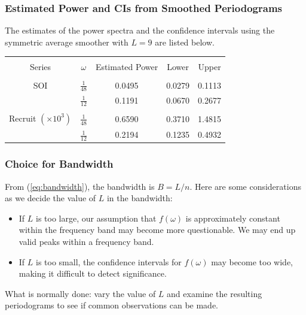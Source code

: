 \documentclass[%
xcolor=pdftex]{beamer}
\begin{document}
\begin{frame}
\frametitle{Estimated Power and CIs from Smoothed Periodograms}

The estimates of the power spectra and the confidence intervals using the symmetric average smoother with $L=9$ are listed below.

\begin{center}
\begin{tabular}{ccccc}
\hline \\
Series & $\omega$ & Estimated Power & Lower & Upper \\
\hline \\
SOI & $\frac{1}{48}$ & 0.0495 & 0.0279 & 0.1113\\
    & $\frac{1}{12}$ & 0.1191 & 0.0670 & 0.2677 \\
    \hline\\
Recruit $(\times 10^3)$ & $\frac{1}{48}$ & 0.6590 & 0.3710 & 1.4815 \\
                        & $\frac{1}{12}$ & 0.2194 & 0.1235 & 0.4932 \\
\hline
\end{tabular}
\end{center}

\end{frame}

\begin{frame}
\frametitle{Choice for Bandwidth}

From (\ref{eq:bandwidth}), the bandwidth is $B = L/n$. Here are some considerations as we decide the value of $L$ in the bandwidth:

\begin{itemize}

\item If $L$ is too large, our assumption that $f(\omega)$ is approximately constant within the frequency band may become more questionable. We may end up \underline{\hspace{25 mm}} valid peaks within a frequency band.

\item If $L$ is too small, the confidence intervals for $f(\omega)$ may become too wide, making it difficult to detect significance. 

\end{itemize}

What is normally done: vary the value of $L$ and examine the resulting periodograms to see if common observations can be made. 

\end{frame}
\end{document}
